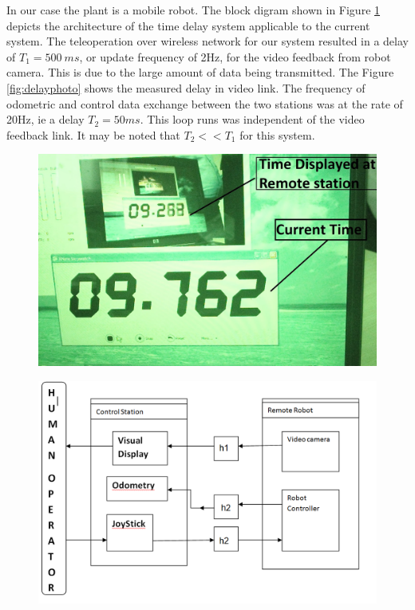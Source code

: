  In our case the plant is a mobile robot. The block digram shown in Figure \ref{fig:blockdigTimeDelay} depicts the architecture of the time delay system applicable to the current system. The teleoperation  over wireless network for our system   resulted in a delay of $T_1= 500~ms$, or update frequency of 2Hz,  for the video feedback from robot camera. This is due to the large amount of data being transmitted. The Figure \ref{fig:delayphoto} shows the measured delay in video link. The frequency of odometric and control  data exchange between the two stations was at the rate of 20Hz, ie a delay $T_2=50ms$. This  loop runs was independent of the video feedback link.  It may be noted that $T_2<<T_1$ for this system.
 \begin{figure}[ht]
 	\centering
 	\begin{minipage}{0.45\textwidth}
 		\centering
 		\includegraphics[width=\linewidth,keepaspectratio]{Chapter7/fig/delayMeasureNew}
 		\label{fig:delayphoto}
 	\end{minipage}%
 	\begin{minipage}{0.55\textwidth}
 		\centering
 		\includegraphics[width=.9\linewidth,keepaspectratio]{Chapter7/fig/BlockTimeDelay}
 		\label{fig:blockdigTimeDelay}
 	\end{minipage}
 \end{figure} 

